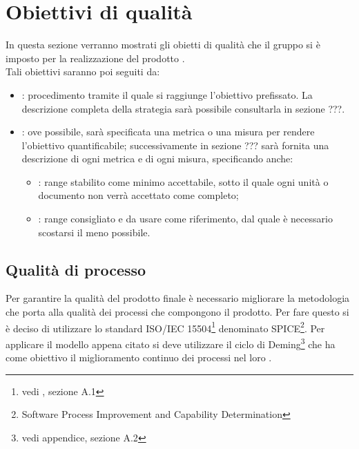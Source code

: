\newpage
\section{Obiettivi di qualità}%
\label{2.1}
In questa sezione verranno mostrati gli obietti di qualità che il gruppo si è imposto per la realizzazione del prodotto \Progetto{}. \\
Tali obiettivi saranno poi seguiti da:
\begin{itemize}
\item {}: procedimento tramite il quale si raggiunge l'obiettivo prefissato. La descrizione completa della strategia sarà possibile consultarla in sezione ???.
\item {}: ove possibile, sarà specificata una metrica o una misura per rendere l'obiettivo quantificabile; successivamente in sezione ??? sarà fornita una descrizione di ogni metrica e di ogni misura, specificando anche:
\begin{itemize}
\item {}: range stabilito come minimo accettabile, sotto il quale ogni unità o documento non verrà accettato come completo;
\item {}: range consigliato e da usare come riferimento, dal quale è necessario scostarsi il meno possibile.
\end{itemize}
\end{itemize}
\subsection{Qualità di processo} %
\label{2.1.1}
Per garantire la qualità del prodotto finale è necessario migliorare la metodologia che porta alla qualità dei processi che compongono il prodotto. Per fare questo si è deciso di utilizzare lo standard ISO/IEC 15504\footnote{vedi , sezione A.1} denominato SPICE\footnote{Software Process Improvement and Capability Determination}.
Per applicare il modello appena citato si deve utilizzare il ciclo di Deming\footnote{vedi appendice, sezione A.2} che ha come obiettivo il miglioramento continuo dei processi nel loro .
